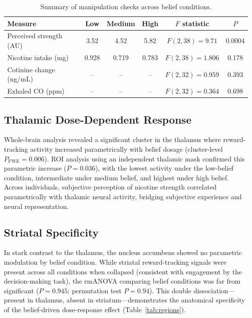 \documentclass[12pt]{article}
\begin{document}
\begin{table}[ht]
\centering
\caption{Summary of manipulation checks across belief conditions.}
\label{tab:checks}
\begin{tabular}{lccccc}
\toprule
Measure & Low & Medium & High & $F$ statistic & $P$ \\
\midrule
Perceived strength (AU) & 3.52 & 4.52 & 5.82 & $F(2,38) = 9.71$ & 0.0004 \\
Nicotine intake (mg) & 0.928 & 0.719 & 0.783 & $F(2,38) = 1.806$ & 0.178 \\
Cotinine change (ng/mL) & -- & -- & -- & $F(2,32) = 0.959$ & 0.393 \\
Exhaled CO (ppm) & -- & -- & -- & $F(2,32) = 0.364$ & 0.698 \\
\bottomrule
\end{tabular}
\end{table}

\subsection{Thalamic Dose-Dependent Response}

Whole-brain analysis revealed a significant cluster in the thalamus where reward-tracking activity increased parametrically with belief dosage (cluster-level $P_{\text{FWE}} = 0.006$). ROI analysis using an independent thalamic mask confirmed this parametric increase ($P = 0.036$), with the lowest activity under the low-belief condition, intermediate under medium belief, and highest under high belief. Across individuals, subjective perception of nicotine strength correlated parametrically with thalamic neural activity, bridging subjective experience and neural representation.

\subsection{Striatal Specificity}

In stark contrast to the thalamus, the nucleus accumbens showed no parametric modulation by belief condition. While striatal reward-tracking signals were present across all conditions when collapsed (consistent with engagement by the decision-making task), the rmANOVA comparing belief conditions was far from significant ($P = 0.945$; permutation test $P = 0.94$). This double dissociation---present in thalamus, absent in striatum---demonstrates the anatomical specificity of the belief-driven dose-response effect (Table~\ref{tab:regions}).
\end{document}
